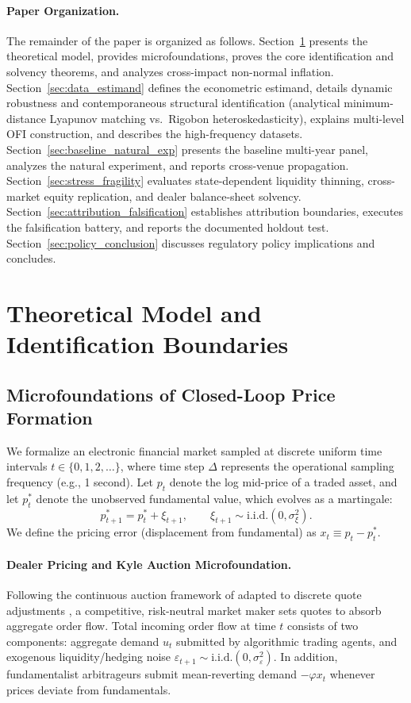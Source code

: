 \documentclass[12pt]{article}
\theoremstyle{definition}
\theoremstyle{remark}
\begin{document}
\paragraph{Paper Organization.}
The remainder of the paper is organized as follows. Section~\ref{sec:model} presents the theoretical model, provides microfoundations, proves the core identification and solvency theorems, and analyzes cross-impact non-normal inflation. Section~\ref{sec:data_estimand} defines the econometric estimand, details dynamic robustness and contemporaneous structural identification (analytical minimum-distance Lyapunov matching vs.\ Rigobon heteroskedasticity), explains multi-level OFI construction, and describes the high-frequency datasets. Section~\ref{sec:baseline_natural_exp} presents the baseline multi-year panel, analyzes the natural experiment, and reports cross-venue propagation. Section~\ref{sec:stress_fragility} evaluates state-dependent liquidity thinning, cross-market equity replication, and dealer balance-sheet solvency. Section~\ref{sec:attribution_falsification} establishes attribution boundaries, executes the falsification battery, and reports the documented holdout test. Section~\ref{sec:policy_conclusion} discusses regulatory policy implications and concludes.

\section{Theoretical Model and Identification Boundaries}
\label{sec:model}

\subsection{Microfoundations of Closed-Loop Price Formation}
We formalize an electronic financial market sampled at discrete uniform time intervals $t \in \{0, 1, 2, \dots\}$, where time step $\Delta$ represents the operational sampling frequency (e.g., 1 second). Let $p_t$ denote the log mid-price of a traded asset, and let $p_t^*$ denote the unobserved fundamental value, which evolves as a martingale:
\begin{equation}
p_{t+1}^* = p_t^* + \xi_{t+1}, \qquad \xi_{t+1} \sim \text{i.i.d.}(0, \sigma_\xi^2).
\label{eq:fundamental_process}
\end{equation}
We define the pricing error (displacement from fundamental) as $x_t \equiv p_t - p_t^*$.

\paragraph{Dealer Pricing and Kyle Auction Microfoundation.}
Following the continuous auction framework of \citet{kyle1985continuous} adapted to discrete quote adjustments \citep{hasbrouck1991,bouchaud2004fluctuations}, a competitive, risk-neutral market maker sets quotes to absorb aggregate order flow. Total incoming order flow at time $t$ consists of two components: aggregate demand $u_t$ submitted by algorithmic trading agents, and exogenous liquidity/hedging noise $\varepsilon_{t+1} \sim \text{i.i.d.}(0, \sigma_\varepsilon^2)$. In addition, fundamentalist arbitrageurs submit mean-reverting demand $-\varphi x_t$ whenever prices deviate from fundamentals.
\end{document}
